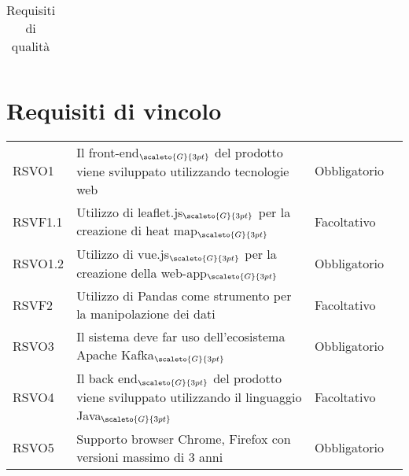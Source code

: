 {{{\begin{center}
\begin{longtable}{|p{4cm}|p{4cm}|p{4cm}|p{3cm}|}
		\caption[Requisiti di qualità]{Requisiti di qualità}\label{4.3}\\
		\end{longtable}
\end{center}

\section{Requisiti di vincolo}\label{RequisitiDiVincolo}
\def\tabularxcolumn#1{m{#1}}
{

\begin{center}
	\renewcommand{\arraystretch}{1.4}
	\begin{longtable}{|p{2.5cm}|p{4.5cm}|p{3.5cm}|p{4cm}|}
		\hline
		\rowcolor{airforceblue}
		\makecell[c]{\textbf{Codice RS}} & \makecell[c]{\textbf{Descrizione}} & \makecell[c]{\textbf{Tipo di requisito}} & \makecell[c]{\textbf{Fonte}} \\
		\hline
		\centering RSVO1  & Il front-end$_{\scaleto{G}{3pt}}$ del prodotto viene sviluppato utilizzando tecnologie web &\centering Obbligatorio  & \makecell[tc]{Capitolato$_{\scaleto{G}{3pt}}$} \\
		\hline
		\centering RSVF1.1  & Utilizzo di leaflet.js$_{\scaleto{G}{3pt}}$ per la creazione di heat map$_{\scaleto{G}{3pt}}$ &\centering  Facoltativo & \makecell[tc]{Capitolato$_{\scaleto{G}{3pt}}$} \\
		\hline
		\centering RSVO1.2  & Utilizzo di vue.js$_{\scaleto{G}{3pt}}$ per la creazione della web-app$_{\scaleto{G}{3pt}}$  &\centering  Obbligatorio  & \makecell[tc]{V. esterno 2021-02-02} \\
		\hline
		\centering RSVF2 & Utilizzo di Pandas come strumento per la manipolazione dei dati & \centering Facoltativo & \makecell[tc]{V. esterno 2021-02-02} \\
		\hline
		\centering RSVO3  & Il sistema deve far uso dell'ecosistema Apache Kafka$_{\scaleto{G}{3pt}}$ &\centering  Obbligatorio  & \makecell[tc]{Capitolato$_{\scaleto{G}{3pt}}$} \\
		\hline
		\centering RSVO4  & Il back end$_{\scaleto{G}{3pt}}$ del prodotto viene sviluppato utilizzando il linguaggio Java$_{\scaleto{G}{3pt}}$ &\centering  Facoltativo  & \makecell[tc]{Capitolato$_{\scaleto{G}{3pt}}$} \\
		\hline
		\centering RSVO5  & Supporto browser Chrome, Firefox con versioni massimo di 3 anni &\centering  Obbligatorio  & \makecell[tc]{Interno} \\

\end{longtable}
\end{center}}}}}
